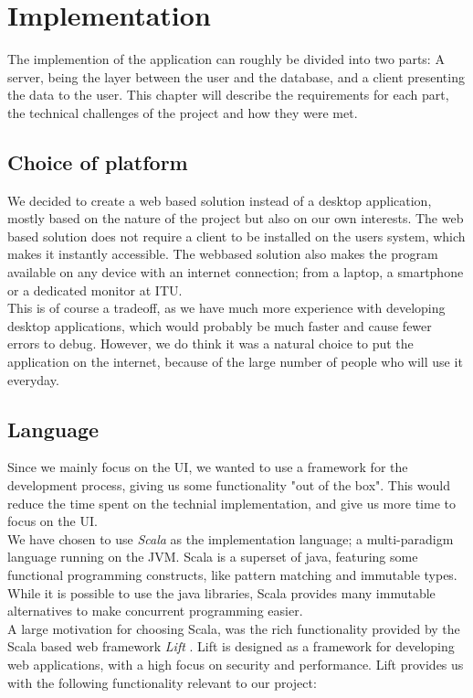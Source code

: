 \chapter{Implementation}
The implemention of the application can roughly be divided into two parts: A server, being the layer between the user and the database, and a client presenting the data to the user. This chapter will describe the requirements for each part, the technical challenges of the project and how they were met. 


\section{Choice of platform}
We decided to create a web based solution instead of a desktop application, mostly based on the nature of the project but also on our own interests. The web based solution does not require a client to be installed on the users system, which makes it instantly accessible. The webbased solution also makes the program available on any device with an internet connection; from a laptop, a smartphone or a dedicated monitor at ITU.\\

This is of course a tradeoff, as we have much more experience with developing desktop applications, which would probably be much faster and cause fewer errors to debug. However, we do think it was a natural choice to put the application on the internet, because of the large number of people who will use it everyday.

\section{Language}
Since we mainly focus on the UI, we wanted to use a framework for the development process, giving us some functionality "out of the box". This would reduce the time spent on the technial implementation, and give us more time to focus on the UI.\\
We have chosen to use \emph{Scala}\cite{scala} as the implementation language; a multi-paradigm language running on the JVM. Scala is a superset of java, featuring some functional programming constructs, like pattern matching and immutable types. While it is possible to use the java libraries, Scala provides many immutable alternatives to make concurrent programming easier. \\

A large motivation for choosing Scala, was the rich functionality provided by the Scala based web framework \emph{Lift} \cite{lift}. Lift is designed as a framework for developing web applications, with a high focus on security and performance. Lift provides us with the following functionality relevant to our project:

